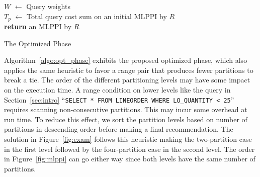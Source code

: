 \documentclass[paper]{ieice}
\begin{document}

\begin{algorithm}[t]
{
	$W$ $\leftarrow$ Query weights \\
	$T_{p}$ $\leftarrow$ Total query cost sum on an initial MLPPI by $R$ \\
	{\bf return} an MLPPI by $R$ \;
}
\caption{The Optimized Phase}
\label{algo:opt_phase}
\end{algorithm}

\vspace{-.2in}

Algorithm~\ref{algo:opt_phase} exhibits the proposed optimized phase, 
which also applies the same heuristic to favor a range pair 
that produces fewer partitions to break a tie.  
The order of the different partitioning levels may have some impact on 
the execution time. A range condition on lower levels like the query 
in Section~\ref{sec:intro} 
``{\tt SELECT * FROM LINEORDER WHERE LO\_QUANTITY < 25}'' 
requires scanning non-consecutive partitions. 
This may \hbox{incur} some overhead at run time. 
To reduce this \hbox{effect}, we sort the partition \hbox{levels} based on number of 
partitions in descending order \hbox{before} making a final \hbox{recommendation}. 
The solution in \hbox{Figure}~\ref{fig:exam} follows this heuristic 
making the two-partition case in the first level 
followed by the four-partition case in the second level. 
The order in Figure~\ref{fig:mlppi} can go \hbox{either} way 
since both levels have the same number of \hbox{partitions}.
\end{document}

